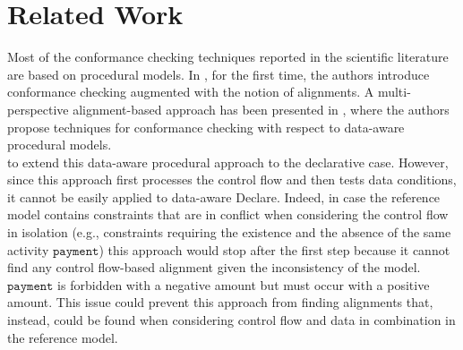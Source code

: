 \section{Related Work}
\label{sec:related}

Most of the conformance checking techniques reported in the scientific literature are based on procedural models. In \cite{DBLP:conf/edoc/AdriansyahDA11}, for the first time, the authors introduce conformance checking augmented with the notion of alignments.
A multi-perspective alignment-based approach has been presented in \cite{MultiPerspective}, where the authors propose techniques for conformance checking with respect to data-aware procedural models. 
\\
\indent
{} to extend this data-aware procedural approach to the declarative case. However, since this approach first processes the control flow and then tests data conditions, it cannot be easily applied to data-aware Declare. Indeed, in case the reference model contains constraints that are in conflict when considering the control flow in isolation (e.g., constraints requiring the existence and the absence of the same activity $\texttt{payment}$) this approach would stop after the first step because it cannot find any control flow-based alignment given the inconsistency of the model.  $\texttt{payment}$ is forbidden with a negative amount but must occur with a positive amount. This issue could prevent this approach from finding alignments that, instead, could be found when considering control flow and data in combination in the reference model.
